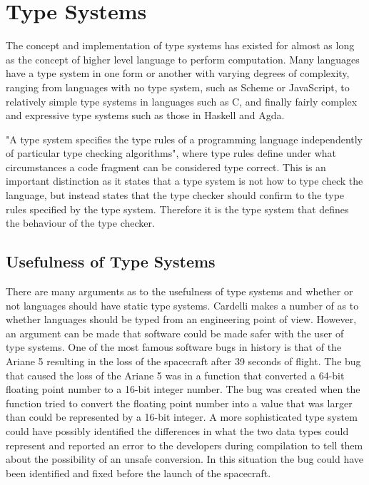 \section{Type Systems}
The concept and implementation of type systems has existed for almost as long as the concept of higher level language to perform computation\cite{Backus:1978:HFI:960118.808380}.
Many languages have a type system in one form or another with varying degrees of complexity,
ranging from languages with no type system, such as Scheme or JavaScript, to relatively simple type systems in languages such as C, and finally fairly complex and expressive type systems such as those in Haskell and Agda.

"A type system specifies the type rules of a programming language independently of particular type checking algorithms"\cite{cardelli1996type}, where type rules define under what circumstances a code fragment can be considered type correct.
This is an important distinction as it states that a type system is not how to type check the language, but instead states that the type checker should confirm to the type rules specified by the type system.
Therefore it is the type system that defines the behaviour of the type checker.  

\subsection{Usefulness of Type Systems}
There are many arguments as to the usefulness of type systems and whether or not languages should have static type systems.
Cardelli makes a number of as to whether languages should be typed from an engineering point of view\cite{cardelli1996type}.
However, an argument can be made that software could be made safer with the user of type systems.
One of the most famous software bugs in history is that of the Ariane 5 resulting in the loss of the spacecraft after 39 seconds of flight.
The bug that caused the loss of the Ariane 5 was in a function that converted a 64-bit floating point number to a 16-bit integer number.
The bug was created when the function tried to convert the floating point number into a value that was larger than could be represented by a 16-bit integer\cite{lions1996ariane}.
A more sophisticated type system could have possibly identified the differences in what the two data types could represent and reported an error to the developers during compilation to tell them about the possibility of an unsafe conversion.
In this situation the bug could have been identified and fixed before the launch of the spacecraft.

